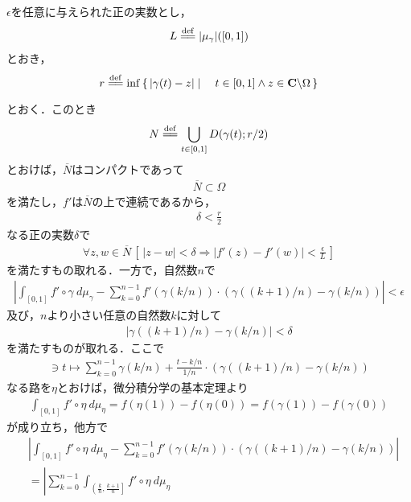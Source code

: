 	\begin{sketch}
		$\epsilon$を任意に与えられた正の実数とし，
		\begin{align}
			L \defeq |\mu_{\gamma}|([0,1])
		\end{align}
		とおき，
		\begin{align}
			r \defeq \inf{}{\Set{|\gamma(t) - z|}{t \in [0,1] \wedge z \in \C \backslash \Omega}}
		\end{align}
		とおく．このとき
		\begin{align}
			N \defeq \bigcup_{t \in [0,1]} \disc{\gamma(t)}{r/2}
		\end{align}
		とおけば，$\overline{N}$はコンパクトであって
		\begin{align}
			\overline{N} \subset \Omega
		\end{align}
		を満たし，$f'$は$\overline{N}$の上で連続であるから，
		\begin{align}
			\delta < \frac{r}{2}
		\end{align}
		なる正の実数$\delta$で
		\begin{align}
			\forall z,w \in \overline{N}\,
			\left[\, |z-w| < \delta \Longrightarrow |f'(z) - f'(w)| < \frac{\epsilon}{L}\, \right]
		\end{align}
		を満たすもの取れる．一方で，自然数$n$で
		\begin{align}
			\left|\int_{[0,1]} f' \circ \gamma\ d\mu_{\gamma}
			- \sum_{k=0}^{n-1} f'(\gamma(k/n)) \cdot \left(\gamma((k+1)/n) - \gamma(k/n)\right)\right|
			< \epsilon
		\end{align}
		及び，$n$より小さい任意の自然数$k$に対して
		\begin{align}
			|\gamma((k+1)/n) - \gamma(k/n)| < \delta
		\end{align}
		を満たすものが取れる．ここで
		\begin{align}
			[0,1] \ni t \longmapsto \sum_{k=0}^{n-1} \gamma(k/n) + \frac{t - k/n}{1/n} \cdot \left(\gamma((k+1)/n) - \gamma(k/n)\right)
		\end{align}
		なる路を$\eta$とおけば，微分積分学の基本定理より
		\begin{align}
			\int_{[0,1]} f' \circ \eta\ d\mu_{\eta} = f(\eta(1)) - f(\eta(0))
			= f(\gamma(1)) - f(\gamma(0))
		\end{align}
		が成り立ち，他方で
		\begin{align}
			&\left|\int_{[0,1]} f' \circ \eta\ d\mu_{\eta}
			- \sum_{k=0}^{n-1} f'(\gamma(k/n)) \cdot \left(\gamma((k+1)/n) - \gamma(k/n)\right)\right| \\
			&= \left|\sum_{k=0}^{n-1} \int_{\left(\frac{k}{n},\frac{k+1}{n}\right]} f' \circ \eta\ d\mu_{\eta}

\end{align}
\end{sketch}
